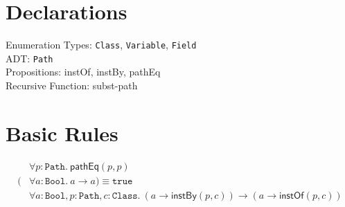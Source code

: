 \documentclass{article}          %
\begin{document}
\section{Declarations}
Enumeration Types: \texttt{Class}, \texttt{Variable}, \texttt{Field}\\
ADT: \texttt{Path}\\
Propositions: \textsf{instOf}, \textsf{instBy}, \textsf{pathEq}\\
Recursive Function: \textsf{subst-path}

\section{Basic Rules}
\begin{align*}
&\forall p:\mathtt{Path}.~\mathsf{pathEq}(p,p)\\
(&\forall a:\mathtt{Bool}.~a \rightarrow a) \equiv \mathtt{true}\\
&\forall a:\mathtt{Bool}, p:\mathtt{Path}, c:\mathtt{Class}.~(a \rightarrow \mathsf{instBy}(p, c)) \rightarrow (a \rightarrow \mathsf{instOf}(p, c))
\end{align*}
\end{document}
